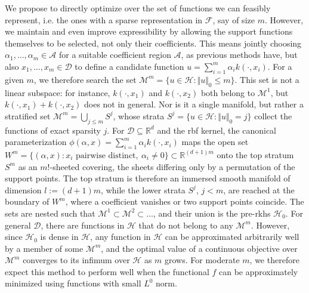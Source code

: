 \documentclass{article}
\newcommand{\R}{\mathbb{R}}
\newcommand{\D}{\mathcal{D}} %
\newcommand{\F}{\mathcal{F}}
\newcommand{\Hs}{\mathcal{H}}
\newcommand{\kernelH}{k}
\newcommand{\vu}{u}
\begin{document}
We propose to directly optimize over the set of functions we can feasibly represent, i.e. the ones with a sparse representation in $\F$, say of size $m$. 
However, we maintain and even improve expressibility by allowing the support functions themselves to be selected, not only their coefficients.
This means jointly choosing $\alpha_1,\ldots,\alpha_m\in\mathcal{A}$ for a suitable coefficient region $\mathcal{A}$, as previous methods have, but also $x_1,\ldots,x_m\in\D$ to define a candidate function $\vu = \sum_{i=1}^m \alpha_i k(\cdot, x_i)$.
For a given $m$, we therefore search the set
$\mathcal{M}^m = \{u \in \Hs : \Vert u \Vert_0 \leq m\}$.
This set is not a linear subspace: for instance, $\kernelH(\cdot, x_1)$ and $\kernelH(\cdot, x_2)$ both belong to $\mathcal{M}^1$, but $\kernelH(\cdot, x_1) + \kernelH(\cdot, x_2)$ does not in general.
Nor is it a single manifold, but rather a stratified set $\mathcal{M}^m = \bigcup_{j\leq m} S^j$, whose strata $S^j = \{\vu\in\Hs : \Vert \vu \Vert_0 = j\}$ collect the functions of exact sparsity $j$.
For $\D\subseteq\R^d$ and the \gls{rbf} kernel, the canonical parameterization $\phi(\alpha, x) = \sum_{i=1}^m \alpha_i\kernelH(\cdot,x_i)$ maps the open set $W^m = \{(\alpha,x) : x_i \text{ pairwise distinct},\ \alpha_i\neq 0\}\subset\R^{(d+1)m}$ onto the top stratum $S^m$ as an $m!$-sheeted covering, the sheets differing only by a permutation of the support points.
The top stratum is therefore an immersed smooth manifold of dimension $l:=(d+1)m$, while the lower strata $S^j$, $j<m$, are reached at the boundary of $W^m$, where a coefficient vanishes or two support points coincide.
The sets are nested such that $\mathcal{M}^1\subset\mathcal{M}^2\subset\ldots$, and their union is the pre-\gls{rkhs} $\Hs_0$.
For general $\D$, there are functions in $\Hs$ that do not belong to any $\mathcal{M}^m$.
However, since $\Hs_0$ is dense in $\Hs$, any function in $\Hs$ can be approximated arbitrarily well by a member of some $\mathcal{M}^m$, and the optimal value of a continuous objective over $\mathcal{M}^m$ converges to its infimum over $\Hs$ as $m$ grows.
For moderate $m$, we therefore expect this method to perform well when the functional $f$ can be approximately minimized using functions with small $L^0$ norm.
\end{document}
